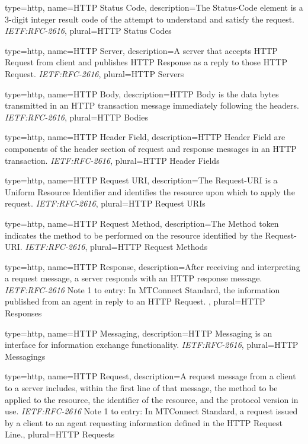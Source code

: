 {
	type={http},
    name={HTTP Status Code},
	description={The Status-Code element is a 3-digit integer result code of the attempt to understand and satisfy the request.  \textit{IETF:RFC-2616}},
	plural={HTTP Status Codes}
}

{
	type={http},
    name={HTTP Server},
	description={A server that accepts \gls{HTTP Request} from \gls{client} and publishes \gls{HTTP Response} as a reply to those \gls{HTTP Request}. \textit{IETF:RFC-2616}},
	plural={HTTP Servers}
}

{
	type={http},
    name={HTTP Body},
	description={\gls{HTTP Body} is the data bytes transmitted in an HTTP transaction message immediately following the headers. \textit{IETF:RFC-2616}},
	plural={HTTP Bodies}
}

{
	type={http},
    name={HTTP Header Field},
	description={\gls{HTTP Header Field} are components of the header section of request and response messages in an HTTP transaction. \textit{IETF:RFC-2616}},
	plural={HTTP Header Fields}
}

{
	type={http},
    name={HTTP Request URI},
	description={The Request-URI is a Uniform Resource Identifier and identifies the resource upon which to apply the request. \textit{IETF:RFC-2616}},
	plural={HTTP Request URIs}
}

{
	type={http},
    name={HTTP Request Method},
	description={The Method  token indicates the method to be performed on the resource identified by the Request-URI. \textit{IETF:RFC-2616}},
	plural={HTTP Request Methods}
}

{
	type={http},
    name={HTTP Response},
	description={After receiving and interpreting a request message, a server responds with an HTTP response message. \textit{IETF:RFC-2616}
Note 1 to entry: In MTConnect Standard, the information published from an \gls{agent} in reply to an \gls{HTTP Request}. },
	plural={HTTP Responses}
}

{
	type={http},
    name={HTTP Messaging},
	description={\gls{HTTP Messaging} is an \gls{interface} for information exchange functionality. \textit{IETF:RFC-2616}},
	plural={HTTP Messagings}
}

{
	type={http},
    name={HTTP Request},
	description={A request message from a client to a server includes, within the first line of that message, the method to be applied to the resource, the identifier of the resource, and the protocol version in use. \textit{IETF:RFC-2616}
Note 1 to entry: In MTConnect Standard, a request issued by a \gls{client} to an \gls{agent} requesting information defined in the \gls{HTTP Request Line}.},
	plural={HTTP Requests}
}

